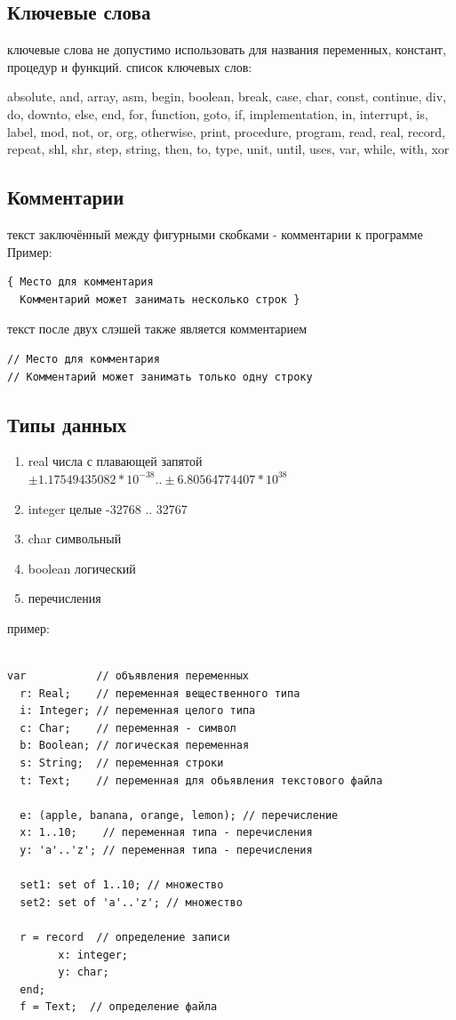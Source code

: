 \documentclass[unicode, 12pt, a4paper,oneside,fleqn]{article}
\begin{document}
\subsection{Ключевые слова}
ключевые слова не допустимо использовать для названия переменных,
констант, процедур и функций.  список ключевых слов:

absolute, and, array, asm, begin, boolean, break, case, char, const,
continue, div, do, downto, else, end, for, function, goto, if,
implementation, in, interrupt, is, label, mod, not, or, org,
otherwise, print, procedure, program, read, real, record, repeat, shl,
shr, step, string, then, to, type, unit, until, uses, var, while,
with, xor

\subsection{Комментарии}
текст заключённый между фигурными скобками - комментарии к программе
Пример:
\begin{verbatim}
{ Место для комментария
  Комментарий может занимать несколько строк }
\end{verbatim}

текст после двух слэшей также является комментарием
\begin{verbatim}
// Место для комментария
// Комментарий может занимать только одну строку
\end{verbatim}




\subsection{Типы данных}
\begin{enumerate}
\item real числа с плавающей запятой \\
 $±1.17549435082 * 10^{-38} .. ±6.80564774407 * 10^{38}$

\item integer целые -32768 .. 32767

\item char символьный
\item boolean логический
\item перечисления
\end{enumerate}
пример:
\begin{lstlisting}

var           // объявления переменных
  r: Real;    // переменная вещественного типа
  i: Integer; // переменная целого типа
  c: Char;    // переменная - символ
  b: Boolean; // логическая переменная
  s: String;  // переменная строки
  t: Text;    // переменная для обьявления текстового файла

  e: (apple, banana, orange, lemon); // перечисление
  x: 1..10;    // переменная типа - перечисления
  y: 'a'..'z'; // переменная типа - перечисления

  set1: set of 1..10; // множество
  set2: set of 'a'..'z'; // множество

  r = record  // определение записи
        x: integer;
        y: char;
  end;
  f = Text;  // определение файла

\end{lstlisting}
\end{document}
